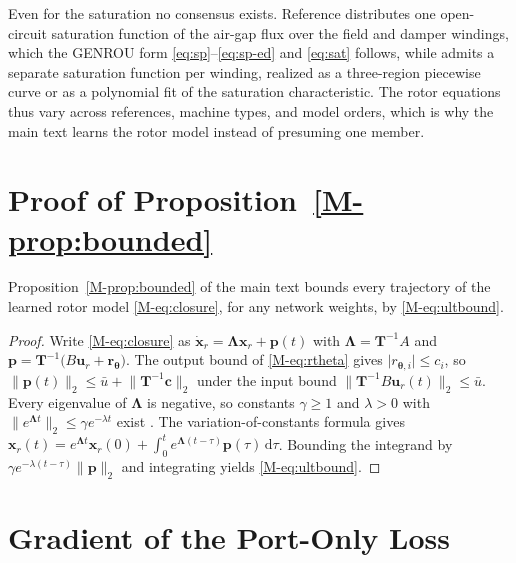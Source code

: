 \documentclass[10pt,journal]{IEEEtran}
\begin{document}
Even for the saturation no consensus exists.
Reference \cite{sauer2018} distributes one open-circuit saturation function of the air-gap flux over the field and damper windings, which the GENROU form \eqref{eq:sp}--\eqref{eq:sp-ed} and \eqref{eq:sat} follows, while \cite{milano2010} admits a separate saturation function per winding, realized as a three-region piecewise curve or as a polynomial fit of the saturation characteristic.
The rotor equations thus vary across references, machine types, and model orders, which is why the main text learns the rotor model instead of presuming one member.

\section{Proof of Proposition~\ref{M-prop:bounded}}\label{sec:proof}

Proposition~\ref{M-prop:bounded} of the main text bounds every trajectory of the learned rotor model \eqref{M-eq:closure}, for any network weights, by \eqref{M-eq:ultbound}.

\begin{proof}
Write \eqref{M-eq:closure} as $\dot{\bm{x}}_r=\bm{\Lambda}\bm{x}_r+\bm{p}(t)$ with $\bm{\Lambda}=\bm{T}^{-1}A$ and $\bm{p}=\bm{T}^{-1}\bigl(B\bm{u}_r+\bm{r}_{\bm{\theta}}\bigr)$.
The output bound of \eqref{M-eq:rtheta} gives $\lvert r_{\bm{\theta},i}\rvert\le c_i$, so $\lVert\bm{p}(t)\rVert_2\le\bar{u}+\lVert\bm{T}^{-1}\bm{c}\rVert_2$ under the input bound $\lVert\bm{T}^{-1}B\bm{u}_r(t)\rVert_2\le\bar{u}$.
Every eigenvalue of $\bm{\Lambda}$ is negative, so constants $\gamma\ge1$ and $\lambda>0$ with $\lVert e^{\bm{\Lambda}t}\rVert_2\le \gamma e^{-\lambda t}$ exist \cite{khalil2002}.
The variation-of-constants formula gives $\bm{x}_r(t)=e^{\bm{\Lambda}t}\bm{x}_r(0)+\int_0^{t}e^{\bm{\Lambda}(t-\tau)}\bm{p}(\tau)\,\mathrm{d}\tau$.
Bounding the integrand by $\gamma e^{-\lambda(t-\tau)}\lVert\bm{p}\rVert_2$ and integrating yields \eqref{M-eq:ultbound}.
\end{proof}

\section{Gradient of the Port-Only Loss}\label{sec:grad}
\end{document}
